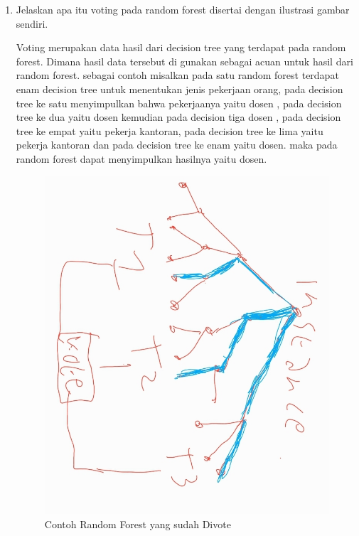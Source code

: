 \begin{enumerate}
\item Jelaskan apa itu voting pada random forest disertai dengan ilustrasi gambar sendiri.\par
Voting merupakan data hasil dari decision tree yang terdapat pada random forest. Dimana hasil data tersebut di gunakan sebagai acuan untuk hasil dari random forest. sebagai contoh misalkan pada satu random forest terdapat enam decision tree untuk menentukan jenis pekerjaan orang, pada decision tree ke satu menyimpulkan bahwa pekerjaanya yaitu dosen , pada decision tree ke dua yaitu dosen kemudian pada decision tiga dosen , pada decision tree ke empat yaitu pekerja kantoran, pada decision tree ke lima yaitu pekerja kantoran dan pada decision tree ke enam yaitu dosen. maka pada random forest dapat menyimpulkan hasilnya yaitu dosen. 
\begin{figure}[H]
    \centering
    \includegraphics[scale=0.2]{figures/1174035/chapter3/random_forest_voted.jpeg}
    \caption{Contoh Random Forest yang sudah Divote}
    \label{contoh}
\end{figure}
\end{enumerate}